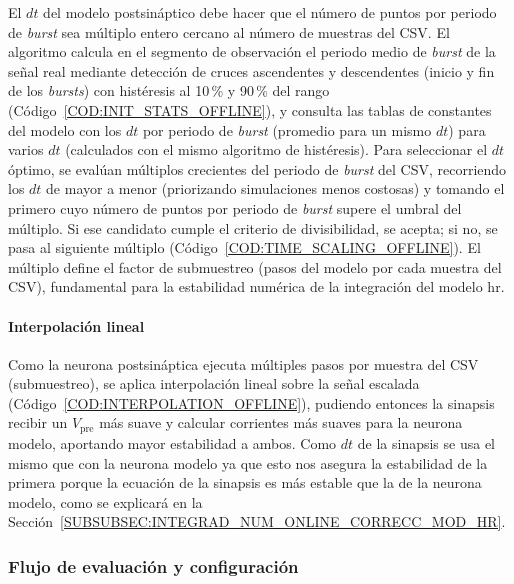 El $dt$ del modelo postsináptico debe hacer que el número de puntos por periodo de \textit{burst} sea múltiplo entero cercano al número de muestras del CSV. El algoritmo calcula en el segmento de observación el periodo medio de \textit{burst} de la señal real mediante detección de cruces ascendentes y descendentes (inicio y fin de los \textit{bursts}) con histéresis al 10\,\% y 90\,\% del rango (Código~\ref{COD:INIT_STATS_OFFLINE}), y consulta las tablas de constantes del modelo con los $dt$ por periodo de \textit{burst} (promedio para un mismo $dt$) para varios $dt$ (calculados con el mismo algoritmo de histéresis). Para seleccionar el $dt$ óptimo, se evalúan múltiplos crecientes del periodo de \textit{burst} del CSV, recorriendo los $dt$ de mayor a menor (priorizando simulaciones menos costosas) y tomando el primero cuyo número de puntos por periodo de \textit{burst} supere el umbral del múltiplo. Si ese candidato cumple el criterio de divisibilidad, se acepta; si no, se pasa al siguiente múltiplo (Código~\ref{COD:TIME_SCALING_OFFLINE}). El múltiplo define el factor de submuestreo (pasos del modelo por cada muestra del CSV), fundamental para la estabilidad numérica de la integración del modelo \ac{hr}.

\paragraph{Interpolación lineal}

Como la neurona postsináptica ejecuta múltiples pasos por muestra del CSV (submuestreo), se aplica interpolación lineal sobre la señal escalada (Código~\ref{COD:INTERPOLATION_OFFLINE}), pudiendo entonces la sinapsis recibir un \(V_{\mathrm{pre}}\) más suave y calcular corrientes más suaves para la neurona modelo, aportando mayor estabilidad a ambos. Como $dt$ de la sinapsis se usa el mismo que con la neurona modelo ya que esto nos asegura la estabilidad de la primera porque la ecuación de la sinapsis es más estable que la de la neurona modelo, como se explicará en la Sección~\ref{SUBSUBSEC:INTEGRAD_NUM_ONLINE_CORRECC_MOD_HR}.

\subsubsection{Flujo de evaluación y configuración\label{SUBSUBSEC:FLUJO_EVALUACION_OFFLINE}}

